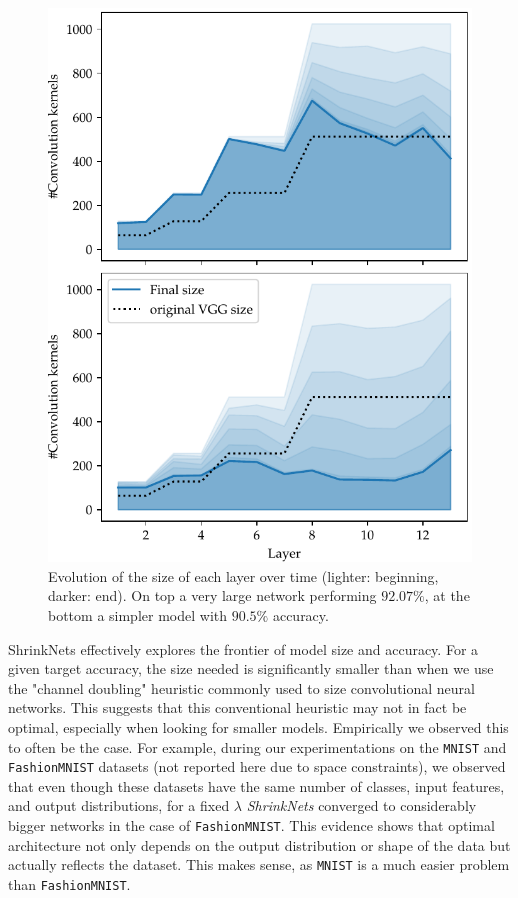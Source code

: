 \begin{figure}[htb]
\begin{center}
\includegraphics[width=.7\columnwidth]{size_evolution}
\vspace*{-5mm} 
\caption{ Evolution of the size of
  each layer over time (lighter: beginning, darker: end). On top a very large
  network performing $92.07\%$, at the bottom a simpler model with $90.5\%$
  accuracy. 
} 
\label{fig:network_size_evolution}
\end{center}
\vspace*{-4mm}
\end{figure}

ShrinkNets effectively explores the frontier of model size and accuracy. For a
given target accuracy, the size needed is significantly smaller than when we use the
"channel doubling" heuristic commonly used to size convolutional neural networks.
This suggests that this conventional heuristic may not in fact be optimal,
especially when looking for smaller models.  Empirically we observed this to
often be the case.  For example, during our experimentations on the
\texttt{MNIST} \cite{Lecun1998} and \texttt{FashionMNIST} \cite{Xiao2017}
datasets (not reported here due to space constraints), we observed that even
though these datasets have the same number of classes, input features, and
output distributions, for a fixed $\lambda$ \textit{ShrinkNets} converged to
considerably bigger networks in the case of \texttt{FashionMNIST}. This evidence
shows that optimal architecture not only depends on the output distribution or
shape of the data but actually reflects the dataset.  This makes sense, as
\texttt{MNIST} is a much easier problem than \texttt{FashionMNIST}.

